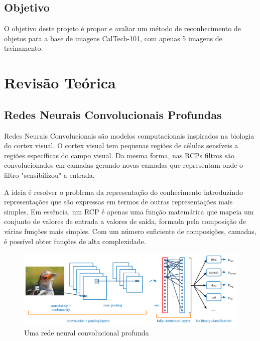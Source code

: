\documentclass[conference]{IEEEtran}
\begin{document}
\subsection{Objetivo}
O objetivo deste projeto é propor e avaliar um método de reconhecimento de objetos para a base de imagens CalTech-101\cite{caltech101}, com apenas 5 imagens de treinamento. 

\section{Revisão Teórica}

\subsection{Redes Neurais Convolucionais Profundas}
Redes Neurais Convolucionais são modelos computacionais inspirados na biologia do cortex visual. O cortex visual tem pequenas regiões de células sensíveis a regiões específicas do campo visual\cite{hinton}.  Da mesma forma, nas RCPs filtros são convolucionados em camadas gerando novas camadas que representam onde o filtro "sensibilizou" a entrada. 

A ideia é resolver o problema da representação do conhecimento introduzindo representações que são expressas em termos de outras representações mais simples\cite{goodfellow}. Em essência, um RCP é apenas uma função matemática que mapeia um conjunto de valores de entrada a valores de saída, formada pela composição de várias funções mais simples.  Com um número suficiente de composições, camadas, é possível obter funções de alta complexidade\cite{hinton, goodfellow}. 


\begin{figure}[ht!]
\begin{center}
\includegraphics[width=\columnwidth]{RCP.png}
\caption{Uma rede neural convolucional profunda}
\end{center}
\end{figure}
\end{document}
